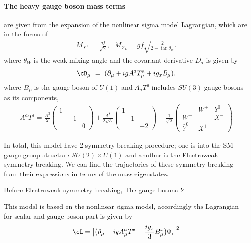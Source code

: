 \paragraph{The heavy gauge boson mass terms} are given 
from the expansion of the nonlinear sigma model Lagrangian, which are in the forms of 
\begin{align}
 M_{X^\mp} = \frac{g f}{\sqrt{2}}, ~~~ M_{Z_H} = g f \sqrt{\frac{2}{2-\tan\theta_w}}.
\end{align}
where $\theta_W$ is the weak mixing angle and the covariant derivative $D_\mu$ is given by
\begin{align}
 \cD_\mu~=~(\partial_\mu + i g A^a T_\mu^a + i g_x B_\mu)  .
\end{align}
where $B_\mu$ is the gauge boson of $U(1)$ and $A_a T^a$ includes $SU(3)$ gauge bosons as its components,
\begin{align}
 A^a T^a = \frac{A^3}{2}\left( \begin{array}{ccc} 1 &  & \\ & -1 &  \\  & & 0 \end{array}\right) 
 + \frac{A^8}{2\sqrt{3}}\left( \begin{array}{ccc} 1 &  & \\ & 1 &  \\  & & -2 \end{array}\right) 
 + \frac{1}{\sqrt{2}}\left( \begin{array}{ccc} & W^+ &Y^0\\W^- & &X^-\\ \bar{Y}^0 &X^+& \end{array}\right) 
\end{align}


In total, this model have 2 symmetry breaking procedure; one is into the SM gauge group structure $SU(2)\times U(1)$ 
and another is the Electroweak symmetry breaking.
We can find the trajactories of these symmetry breaking from their expressions in terms of the mass eigenstates. 

Before Electroweak symmetry breaking, 
The gauge bosons $Y$

This model is based on the nonlinear sigma model, accordingly 
the Lagrangian for scalar and gauge boson part is given by 
\begin{align}
 \cL = \big| \big(\partial_\mu+igA_\mu^a T^a -\frac{ig_x}{3} B_\mu^x \big) \Phi_i \big|^2
\end{align}


